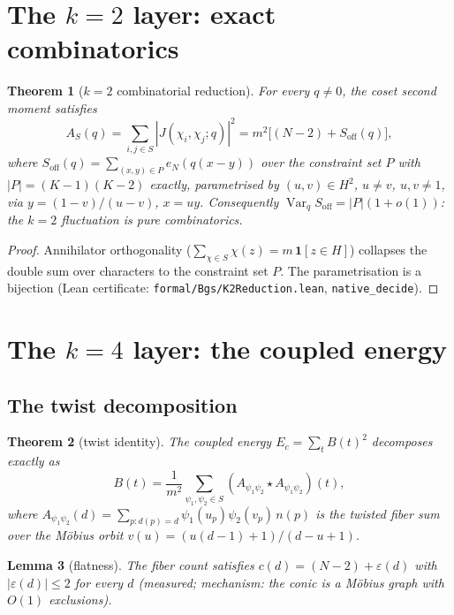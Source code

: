 \documentclass[11pt]{article}
\newtheorem{theorem}{Theorem}[section]
\newtheorem{lemma}[theorem]{Lemma}
\begin{document}
\section{The \texorpdfstring{$k=2$}{k=2} layer: exact combinatorics}
\label{sec:k2}

\begin{theorem}[$k=2$ combinatorial reduction]\label{thm:k2}
For every $q \neq 0$, the coset second moment satisfies
\[
  A_S(q) = \sum_{i,j \in S}|J(\chi_i,\chi_j;q)|^2
         = m^2\big[(N{-}2) + S_{\mathrm{off}}(q)\big],
\]
where $S_{\mathrm{off}}(q) = \sum_{(x,y) \in P} e_N(q(x{-}y))$ over
the constraint set $P$ with $|P| = (K{-}1)(K{-}2)$ exactly,
parametrised by $(u,v) \in H^2$, $u \neq v$, $u,v \neq 1$, via
$y = (1{-}v)/(u{-}v)$, $x = uy$.  Consequently
$\operatorname{Var}_q S_{\mathrm{off}} = |P|(1 + o(1))$: the $k{=}2$
fluctuation is pure combinatorics.
\end{theorem}

\begin{proof}
Annihilator orthogonality
($\sum_{\chi \in S}\chi(z) = m\,\mathbf{1}[z \in H]$) collapses the
double sum over characters to the constraint set $P$.  The
parametrisation is a bijection (Lean certificate:
\texttt{formal/Bgs/K2Reduction.lean}, \texttt{native\_decide}).
\end{proof}

\section{The \texorpdfstring{$k=4$}{k=4} layer: the coupled energy}
\label{sec:k4}

\subsection{The twist decomposition}

\begin{theorem}[twist identity]\label{thm:twist}
The coupled energy $E_c = \sum_t B(t)^2$ decomposes exactly as
\[
  B(t) = \frac{1}{m^2}\sum_{\psi_1,\psi_2 \in S}
  (A_{\psi_1\psi_2} \star A_{\psi_1\psi_2})(t),
\]
where $A_{\psi_1\psi_2}(d) = \sum_{p: d(p) = d}\psi_1(u_p)\psi_2(v_p)
\,n(p)$ is the twisted fiber sum over the M\"obius orbit
$v(u) = (u(d{-}1)+1)/(d{-}u+1)$.
\end{theorem}

\begin{lemma}[flatness]\label{lem:flatness}
The fiber count satisfies $c(d) = (N{-}2) + \varepsilon(d)$ with
$|\varepsilon(d)| \le 2$ for every $d$ (measured; mechanism: the
conic is a M\"obius graph with $O(1)$ exclusions).
\end{lemma}
\end{document}
